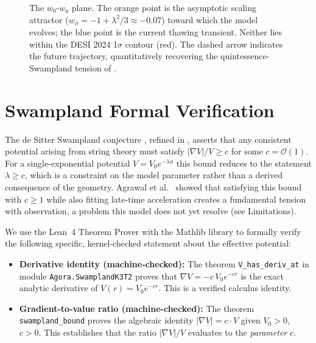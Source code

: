 \documentclass[12pt]{article}
\begin{document}
\begin{figure}[ht]
\centering
{}
\caption{The $w_0$-$w_a$ plane. The orange point is the asymptotic scaling attractor
($w_\phi = -1 + \lambda^2/3 \approx -0.07$) toward which the model evolves; the blue point
is the current thawing transient. Neither lies within the DESI 2024 1$\sigma$ contour (red).
The dashed arrow indicates the future trajectory, quantitatively recovering the
quintessence-Swampland tension of \cite{agrawal2018cosmological}.}
\label{fig:w0wa}
\end{figure}

\section{Swampland Formal Verification}\label{sec:swampland}

The de Sitter Swampland conjecture \cite{obied2018dS}, refined in \cite{ooguri2019refined}, asserts that any consistent
potential arising from string theory must satisfy $|\nabla V|/V \ge c$ for some $c = \mathcal{O}(1)$.
For a single-exponential potential $V = V_0 e^{-\lambda\phi}$ this bound reduces to the statement
$\lambda \ge c$, which is a constraint on the model parameter rather than a derived consequence of the geometry.
Agrawal et al.\ \cite{agrawal2018cosmological} showed that satisfying this bound with $c \ge 1$
while also fitting late-time acceleration creates a fundamental tension with observation,
a problem this model does not yet resolve (see Limitations).

We use the Lean~4 Theorem Prover \cite{moura2021} with the Mathlib library \cite{mathlib2020}
to formally verify the following specific, kernel-checked statement about the effective potential:
\begin{itemize}
  \item \textbf{Derivative identity (machine-checked):} The theorem \texttt{V\_has\_deriv\_at}
    in module \texttt{Agora.SwamplandK3T2} proves that $\nabla V = -c\,V_0 e^{-cr}$
    is the exact analytic derivative of $V(r) = V_0 e^{-cr}$. This is a verified calculus identity.
  \item \textbf{Gradient-to-value ratio (machine-checked):} The theorem \texttt{swampland\_bound}
    proves the algebraic identity $|\nabla V| = c \cdot V$ given $V_0 > 0$, $c > 0$.
    This establishes that the ratio $|\nabla V|/V$ evaluates to the \emph{parameter} $c$.
\end{itemize}
\end{document}
